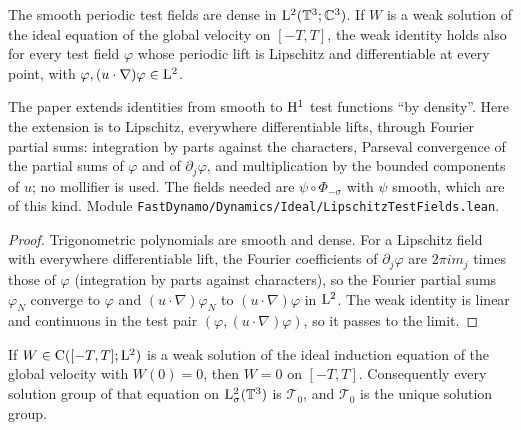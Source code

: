 \begin{lemma}
  \label{lem:dynamics:lipschitz-test-fields}
  \leanok
  The smooth periodic test fields are dense in $\mathrm{L}^2(\mathbb{T}^3;\mathbb{C}^3)$.  If $W$ is a weak
  solution of the ideal equation of the global velocity on $[-T,T]$, the weak identity holds
  also for every test field $\varphi$ whose periodic lift is Lipschitz and differentiable at
  every point, with $\varphi,(u\cdot\nabla)\varphi\in\mathrm{L}^2$.
\end{lemma}

The paper extends identities from smooth to $\mathrm{H}^1$ test functions ``by density''.  Here the
extension is to Lipschitz, everywhere differentiable lifts, through Fourier partial sums:
integration by parts against the characters, Parseval convergence of the partial sums of
$\varphi$ and of $\partial_j\varphi$, and multiplication by the bounded components of $u$; no
mollifier is used.  The fields needed are $\psi\circ\Phi_{-\sigma}$ with $\psi$ smooth, which
are of this kind.  Module \texttt{FastDynamo/Dynamics/Ideal/LipschitzTestFields.lean}.

\begin{proof}
  \leanok
  Trigonometric polynomials are smooth and dense.  For a Lipschitz field with everywhere
  differentiable lift, the Fourier coefficients of $\partial_j\varphi$ are $2\pi im_j$ times
  those of $\varphi$ (integration by parts against characters), so the Fourier partial sums
  $\varphi_N$ converge to $\varphi$ and $(u\cdot\nabla)\varphi_N$ to $(u\cdot\nabla)\varphi$
  in $\mathrm{L}^2$.  The weak identity is linear and continuous in the test pair
  $(\varphi,(u\cdot\nabla)\varphi)$, so it passes to the limit.
\end{proof}

\begin{lemma}
  \label{lem:dynamics:ideal-weak-uniqueness}
  \leanok
  If $W\in\mathrm{C}([-T,T];\mathrm{L}^2)$ is a weak solution of the ideal induction equation of the global
  velocity with $W(0)=0$, then $W=0$ on $[-T,T]$.  Consequently every solution group of that
  equation on $\mathrm{L}^2_\sigma(\mathbb{T}^3)$ is $\mathcal T_0$, and $\mathcal T_0$ is the unique solution
  group.
\end{lemma}

